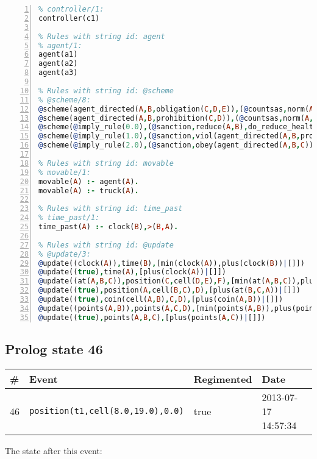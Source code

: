 \documentclass[11pt]{article}\usepackage[utf8]{inputenc}\usepackage{geometry}
\begin{document}
\begin{lstlisting}[language=Prolog, numbers=left]
% Rules with string id: controller
% controller/1:
controller(c1)

% Rules with string id: agent
% agent/1:
agent(a1)
agent(a2)
agent(a3)

% Rules with string id: @scheme
% @scheme/8:
@scheme(agent_directed(A,B,obligation(C,D,E)),(@countsas,norm(A,B,F,obligation(C,D,E)),F),false,(listTrue(C)),(time_past(D)),false,[plus(viol(agent_directed(A,B,obligation(C,D,E))))|[]],[plus(obey(agent_directed(A,B,obligation(C,D,E))))|[]])
@scheme(agent_directed(A,B,prohibition(C,D)),(@countsas,norm(A,B,E,prohibition(C,D)),E),(listTrue(C)),false,(false),false,[plus(viol(agent_directed(A,B,prohibition(C,D))))|[]],[plus(obey(agent_directed(A,B,prohibition(C,D))))|[]])
@scheme(@imply_rule(0.0),(@sanction,reduce(A,B),do_reduce_health(A,B),notifyAgent(A,changed(status))),true,false,false,false,[min(reduce(A,B))|[]],[])
@scheme(@imply_rule(1.0),(@sanction,viol(agent_directed(A,B,prohibition(C,D))),do_sanction(D)),true,false,false,false,[min(viol(agent_directed(A,B,prohibition(C,D))))|[]],[])
@scheme(@imply_rule(2.0),(@sanction,obey(agent_directed(A,B,C))),true,false,false,false,[min(obey(agent_directed(A,B,C)))|[]],[])

% Rules with string id: movable
% movable/1:
movable(A) :- agent(A).
movable(A) :- truck(A).

% Rules with string id: time_past
% time_past/1:
time_past(A) :- clock(B),>(B,A).

% Rules with string id: @update
% @update/3:
@update((clock(A)),time(B),[min(clock(A)),plus(clock(B))|[]])
@update((true),time(A),[plus(clock(A))|[]])
@update((at(A,B,C)),position(C,cell(D,E),F),[min(at(A,B,C)),plus(at(D,E,C))|[]])
@update((true),position(A,cell(B,C),D),[plus(at(B,C,A))|[]])
@update((true),coin(cell(A,B),C,D),[plus(coin(A,B))|[]])
@update((points(A,B)),points(A,C,D),[min(points(A,B)),plus(points(A,D))|[]])
@update((true),points(A,B,C),[plus(points(A,C))|[]])

\end{lstlisting}
\clearpage 
\subsection{Prolog state 46}
\begin{table}[ht]
\centering 
\begin{tabular}{l l l l} 
\textbf{\#} & \textbf{Event} & \textbf{Regimented} & \textbf{Date} \\ [0.5ex] 
\hline
46&\texttt{position(t1,cell(8.0,19.0),0.0)}&true&2013-07-17 14:57:34\\ [1ex] \hline\end{tabular}
\end{table}
The state after this event:
\end{document}
